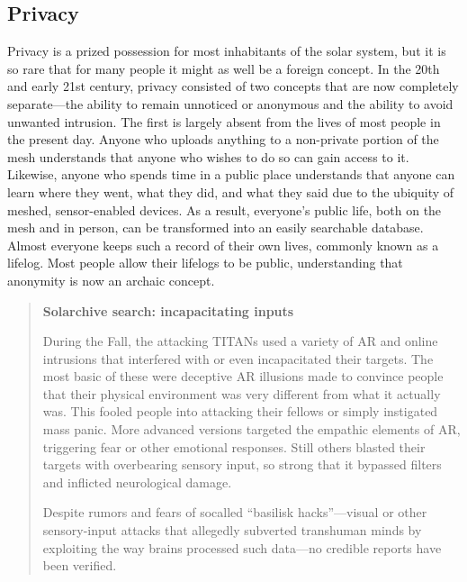 \subsection{Privacy}
\label{sec:privacy}

Privacy is a prized possession for most inhabitants of the solar
system, but it is so rare that for many people it might as well be a
foreign concept. In the 20th and early 21st century, privacy consisted
of two concepts that are now completely separate—the ability to remain
unnoticed or anonymous and the ability to avoid unwanted
intrusion. The first is largely absent from the lives of most people
in the present day. Anyone who uploads anything to a non-private
portion of the mesh understands that anyone who wishes to do so can
gain access to it. Likewise, anyone who spends time in a public place
understands that anyone can learn where they went, what they did, and
what they said due to the ubiquity of meshed, sensor-enabled
devices. As a result, everyone's public life, both on the mesh and in
person, can be transformed into an easily searchable database.  Almost
everyone keeps such a record of their own lives, commonly known as a
lifelog. Most people allow their lifelogs to be public, understanding
that anonymity is now an archaic concept.

\begin{quotation}
  \textbf{Solarchive search: incapacitating inputs}
  
  During the Fall, the attacking TITANs used a variety of AR and
  online intrusions that interfered with or even incapacitated their
  targets. The most basic of these were deceptive AR illusions made to
  convince people that their physical environment was very different
  from what it actually was. This fooled people into attacking their
  fellows or simply instigated mass panic. More advanced versions
  targeted the empathic elements of AR, triggering fear or other
  emotional responses. Still others blasted their targets with
  overbearing sensory input, so strong that it bypassed filters and
  inflicted neurological damage.

  Despite rumors and fears of socalled “basilisk hacks”—visual or
  other sensory-input attacks that allegedly subverted transhuman
  minds by exploiting the way brains processed such data—no credible
  reports have been verified.
\end{quotation}

